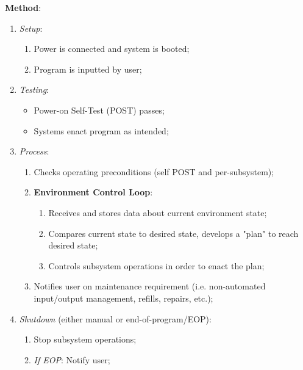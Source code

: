 \documentclass{report}
\begin{document}
\textbf{Method}:
\begin{enumerate}
    \item \textit{Setup}:
    \begin{enumerate}
        \item Power is connected and system is booted;
        \item Program is inputted by user;
    \end{enumerate}
    \item \textit{Testing}:
    \begin{itemize}
        \item Power-on Self-Test (POST) passes;
        \item Systems enact program as intended;
    \end{itemize}
    \item \textit{Process}:
    \begin{enumerate}
        \item Checks operating preconditions (self POST and per-subsystem);
        \item \textbf{Environment Control Loop}:
        \begin{enumerate}
            \item Receives and stores data about current environment state;
            \item Compares current state to desired state, develops a "plan" to reach desired state;
            \item Controls subsystem operations in order to enact the plan;
        \end{enumerate}
        \item Notifies user on maintenance requirement (i.e. non-automated input/output management, refills, repairs, etc.);
    \end{enumerate}
    \item \textit{Shutdown} (either manual or end-of-program/EOP):
    \begin{enumerate}
        \item Stop subsystem operations;
        \item \textit{If EOP}: Notify user;
    \end{enumerate}
\end{enumerate}
\end{document}
